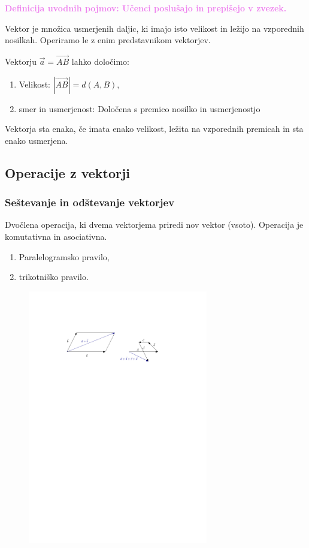 \documentclass{article}
\begin{document}
\textbf{\textcolor{violet}{Definicija uvodnih pojmov: Učenci poslušajo in prepišejo v zvezek.}}

Vektor je množica usmerjenih daljic, ki imajo isto velikost in ležijo na vzporednih nosilkah. Operiramo le z enim predstavnikom vektorjev.

Vektorju $\vec{a}=\vec{AB}$ lahko določimo:
\begin{enumerate}[i]
    \item Velikost: $|\vec{AB}|=d(A,B)$,
    \item smer in usmerjenost: Določena s premico nosilko in usmerjenostjo
\end{enumerate}

Vektorja sta enaka, če imata enako velikost, ležita na vzporednih premicah in sta enako usmerjena.

\subsection*{Operacije z vektorji}

\subsubsection*{Seštevanje in odštevanje vektorjev}

Dvočlena operacija, ki dvema vektorjema priredi nov vektor (vsoto). Operacija je komutativna in asociativna.

\begin{enumerate}[i]
    \item Paralelogramsko pravilo,
    \item trikotniško pravilo.
\end{enumerate}

\begin{figure}[H]
    \includegraphics[width=0.7\textwidth]{sestevanje_vektorjev.pdf}
    \centering
\end{figure}
\end{document}
